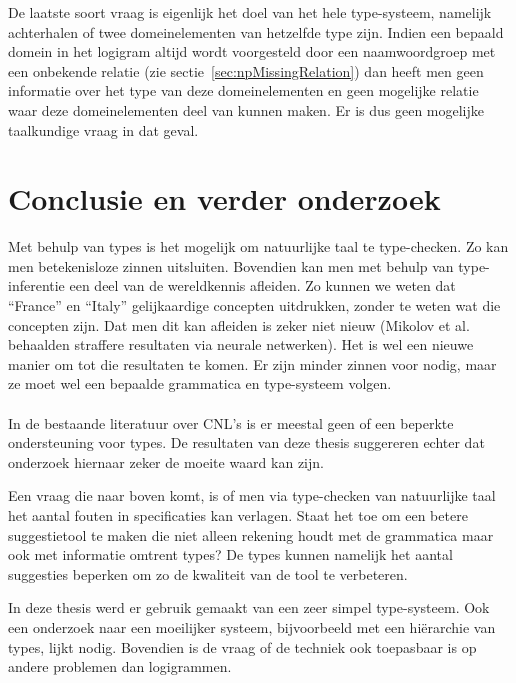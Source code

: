 De laatste soort vraag is eigenlijk het doel van het hele type-systeem, namelijk achterhalen of twee domeinelementen van hetzelfde type zijn. Indien een bepaald domein in het logigram altijd wordt voorgesteld door een naamwoordgroep met een onbekende relatie (zie sectie~\ref{sec:npMissingRelation}) dan heeft men geen informatie over het type van deze domeinelementen en geen mogelijke relatie waar deze domeinelementen deel van kunnen maken. Er is dus geen mogelijke taalkundige vraag in dat geval.

\section{Conclusie en verder onderzoek}
Met behulp van types is het mogelijk om natuurlijke taal te type-checken. Zo kan men betekenisloze zinnen uitsluiten. Bovendien kan men met behulp van type-inferentie een deel van de wereldkennis afleiden. Zo kunnen we weten dat ``France'' en ``Italy'' gelijkaardige concepten uitdrukken, zonder te weten wat die concepten zijn. Dat men dit kan afleiden is zeker niet nieuw (Mikolov et al. \cite{Mikolov2013} behaalden straffere resultaten via neurale netwerken). Het is wel een nieuwe manier om tot die resultaten te komen. Er zijn minder zinnen voor nodig, maar ze moet wel een bepaalde grammatica en type-systeem volgen.

\paragraph{} In de bestaande literatuur over CNL's is er meestal geen of een beperkte ondersteuning voor types. De resultaten van deze thesis suggereren echter dat onderzoek hiernaar zeker de moeite waard kan zijn.

Een vraag die naar boven komt, is of men via type-checken van natuurlijke taal het aantal fouten in specificaties kan verlagen. Staat het toe om een betere suggestietool te maken die niet alleen rekening houdt met de grammatica maar ook met informatie omtrent types? De types kunnen namelijk het aantal suggesties beperken om zo de kwaliteit van de tool te verbeteren.

In deze thesis werd er gebruik gemaakt van een zeer simpel type-systeem. Ook een onderzoek naar een moeilijker systeem, bijvoorbeeld met een hiërarchie van types, lijkt nodig. Bovendien is de vraag of de techniek ook toepasbaar is op andere problemen dan logigrammen.
